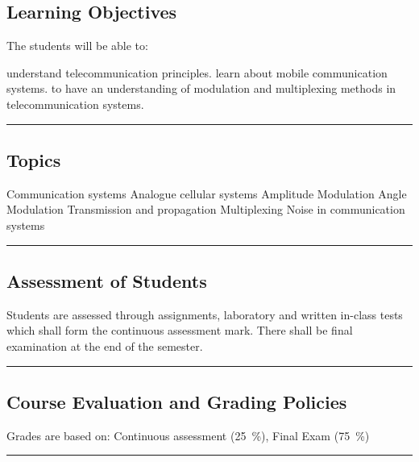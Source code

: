 \subsection*{Learning Objectives}
The students will be able to:
\begin{outline}
    \1 understand telecommunication principles.
    \1 learn about mobile communication systems.
    \1 to have an understanding of modulation and multiplexing methods in telecommunication systems.
\end{outline}
\vspace{2ex} \hrule\vspace{2ex}

\subsection*{Topics}
\begin{outline}
    \1 Communication systems
    \1 Analogue cellular systems
    \1 Amplitude Modulation
    \1 Angle Modulation
    \1 Transmission and propagation
    \1 Multiplexing
    \1 Noise in communication systems
\end{outline}
\vspace{2ex} \hrule\vspace{2ex}

\subsection*{Assessment of Students}
\begin{outline}
    \1 Students are assessed through assignments, laboratory and written in-class tests which shall form the continuous assessment mark.
    \1 There shall be final examination at the end of the semester.
\end{outline}
\vspace{2ex}\hrule\vspace{2ex}

\subsection*{Course Evaluation and Grading Policies}
Grades are based on:
Continuous assessment (\qty{25}{\percent}),
Final Exam (\qty{75}{\percent})
\vspace{2ex}\hrule\vspace{2ex}

